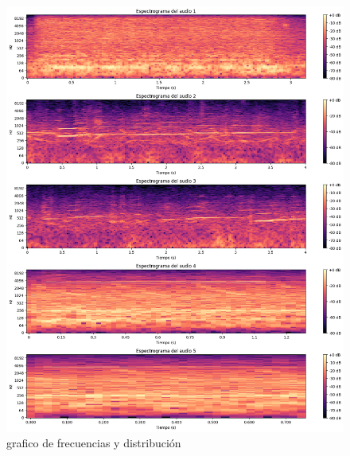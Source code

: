 \begin{figure}[!h]
	\centering
	\includegraphics[width=15cm]{Images/Espectrograma}
	\caption{grafico de frecuencias y distribución}
	\label{fig:FyD}
\end{figure}

